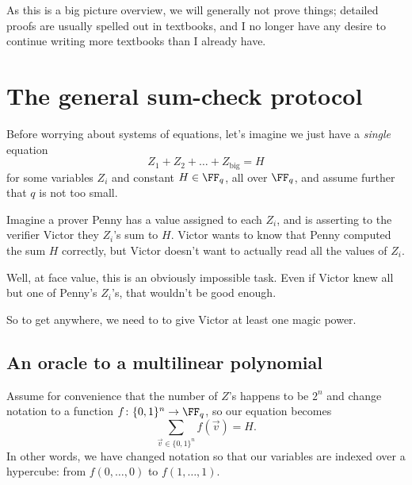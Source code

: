 \documentclass[11pt]{scrreprt}
\begin{document}
As this is a big picture overview, we will generally not prove things;
detailed proofs are usually spelled out in textbooks,
and I no longer have any desire to continue writing more textbooks than I already have.

\section{The general sum-check protocol}
Before worrying about systems of equations, let's imagine we just have a
\emph{single} equation
\[ Z_1 + Z_2 + \dots + Z_{\text{big}} = H \]
for some variables $Z_i$ and constant $H \in \FF_q$, all over $\FF_q$,
and assume further that $q$ is not too small.

Imagine a prover Penny has a value assigned to each $Z_i$,
and is asserting to the verifier Victor they $Z_i$'s sum to $H$.
Victor wants to know that Penny computed the sum $H$ correctly,
but Victor doesn't want to actually read all the values of $Z_i$.

Well, at face value, this is an obviously impossible task.
Even if Victor knew all but one of Penny's $Z_i$'s, that wouldn't be good enough.

So to get anywhere, we need to to give Victor at least one magic power.

\subsection{An oracle to a multilinear polynomial}
Assume for convenience that the number of $Z$'s happens to be $2^n$
and change notation to a function $f \colon \{0,1\}^n \to \FF_q$, so our equation becomes
\[ \sum_{\vec v \in \{0,1\}^n} f(\vec v) = H. \]
In other words, we have changed notation so that our variables are indexed over a
hypercube: from $f(0, \dots, 0)$ to $f(1, \dots, 1)$.
\end{document}
